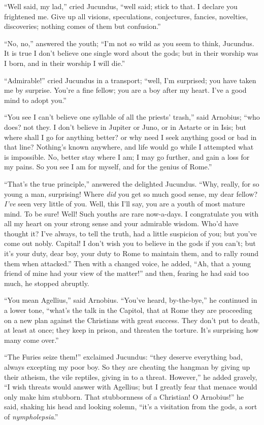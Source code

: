 ``Well said, my lad,'' cried Jucundus, ``well said;
stick to that. I declare you frightened me. Give up all visions,
speculations, conjectures, fancies, novelties, discoveries; nothing
comes of them but confusion.''

``No, no,'' answered the youth; ``I'm not so wild as
you seem to think, Jucundus. It is true I don't believe one single
word about the gods; but in their worship was I born, and in their
worship I will die.''

``Admirable!'' cried Jucundus in a transport; ``well, I'm
surprised; you have taken me by surprise. You're a fine fellow; you
are a boy after my heart. I've a good mind to adopt you.''

``You see I can't believe one syllable of all the priests'
trash,'' said Arnobius; ``who does? not they. I don't believe
in Jupiter or Juno, or in Astarte or in Isis; but where shall I go for
anything better? or why need I seek anything good or bad in that line?
Nothing's known anywhere, and life would go while I attempted what is
impossible. No, better stay where I am; I may go further, and gain a
loss for my pains. So you see I am for myself, and for the genius of
Rome.''

``That's the true principle,'' answered the delighted
Jucundus. ``Why, really, for so young a man, surprising! Where \emph{did}
you get so much good sense, my dear fellow? \emph{I've} seen very
little of you. Well, this I'll say, you are a youth of most mature
mind. To be sure! Well! Such youths are rare now-a-days. I
congratulate you with all my heart on your strong sense and your
admirable wisdom. Who'd have thought it? I've always, to tell the
truth, had a little suspicion of you; but you've come out nobly. Capital! I don't wish you to believe in the gods if you can't; but it's
your duty, dear boy, your duty to Rome to maintain them, and to rally
round them when attacked.'' Then with a changed voice, he added,
``Ah, that a young friend of mine had your view of the
matter!'' and then, fearing he had said too much, he stopped
abruptly.

``You mean Agellius,'' said Arnobius. ``You've heard,
by-the-bye,'' he continued in a lower tone, ``what's the talk
in the Capitol, that at Rome they are proceeding on a new plan against
the Christians with great success. They don't put to death, at least
at once; they keep in prison, and threaten the torture. It's
surprising how many come over.''

``The Furies seize them!'' exclaimed Jucundus: ``they
deserve everything bad, always excepting my poor boy. So they are
cheating the hangman by giving up their atheism, the vile reptiles,
giving in to a threat. However,'' he added gravely, ``I wish
threats would answer with Agellius; but I greatly fear that menace
would only make him stubborn. That stubbornness of a Christian! O
Arnobius!'' he said, shaking his head and looking solemn, ``it's
a visitation from the gods, a sort of \emph{nympholepsia}.''

